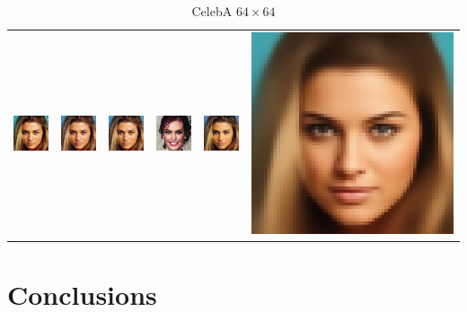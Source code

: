 \begin{table}[h!]
{\begin{tabular}{cccccc}
        \includegraphics[width=.15\textwidth]{chapter4/figures/images/celebA/original/18.png} &   
        \includegraphics[width=.15\textwidth]{chapter4/figures/images/celebA/reconstruction/18.png} &
        \includegraphics[width=.15\textwidth]{chapter4/figures/images/celebA/corrected_reconstruction/18.png} &
        \includegraphics[width=.15\textwidth]{chapter4/figures/images/celebA/diffusion_decoder_beta_0.01/18.png} &
        \includegraphics[width=.15\textwidth]{chapter4/figures/images/celebA/diffusion_decoder_beta_0/18.png} &
        \includegraphics[width=.15\textwidth]{chapter4/figures/images/celebA/VAE_reconstruction/18.png} \\
    \end{tabular}}
    \caption{CelebA $64\times 64$}
    \label{ch4:fig:celebA_qualitative_comparison}
\end{table}

\section{Conclusions}

